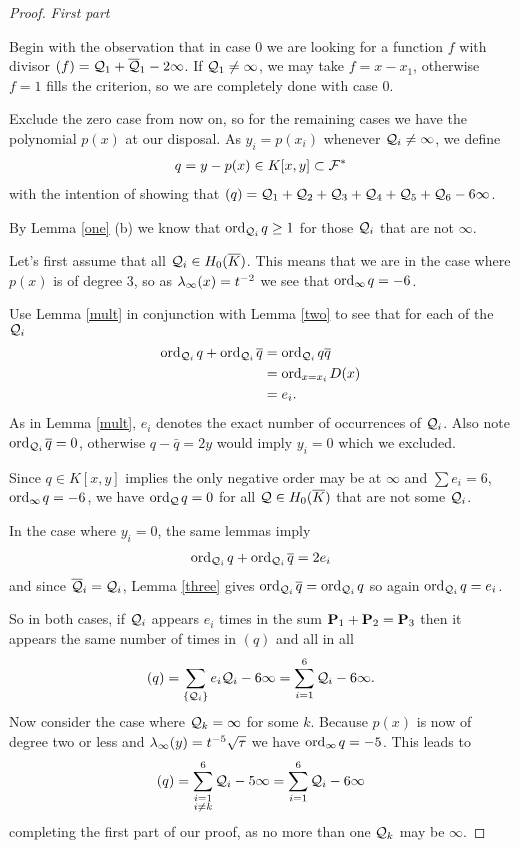 \documentclass[english,11pt,a4paper]{article}
\begin{document}
\newpage
\begin{proof}\textit{First part}

  Begin with the observation that in case 0 we are looking for a function $f$ with divisor $(f) = \q_1 + \bar \q_1 - 2 \infty$. If $\q_1 \neq \infty$, we may take $f = x-x_1$, otherwise $f = 1$ fills the criterion, so we are completely done with case 0.

  Exclude the zero case from now on, so for the remaining cases we have the polynomial $p(x)$ at our disposal. As $y_i = p(x_i)$ whenever $\q_i \neq \infty$, we define
  \begin{align*}
    q = y -p(x) \in K[x,y] \subset \F^*
  \end{align*}
  with the intention of showing that $(q) = \q_1 + \q_2 + \q_3 + \q_4 + \q_5 + \q_6 - 6 \infty$.

  By Lemma \ref{one} (b) we know that $\ordqi q \geq 1$ for those $\q_i$ that are not $\infty$.

  Let's first assume that all $\q_i \in \enkb$. This means that we are in the case where $p(x)$ is of degree 3, so as $\li (x) = t^{-2}$ we see that $\ordi q = -6$.

  Use Lemma \ref{mult} in conjunction with Lemma \ref{two} to see that for each of the $\q_i$
  \begin{align*}
    \ordqi q + \ordqi \bar q &= \ordqi q \bar q\\
                    &= \text{ord}_{x=x_i}\hspace{0.4mm} D(x)\\
                    &= e_i.
  \end{align*}
  As in Lemma \ref{mult}, $e_i$ denotes the exact number of occurrences of $\q_i$. Also note $\ordqi \bar q = 0$, otherwise $q - \bar q = 2y$ would imply $y_i = 0$ which we excluded.

  Since $q \in K[x,y]$ implies the only negative order may be at $\infty$ and $\sum e_i = 6$, $\ordi q = -6$, we have $\ordq q = 0$ for all $\q \in \enkb$ that are not some $\q_i$.

  In the case where $y_i = 0$, the same lemmas imply
  \begin{align*}
    \ordqi q + \ordqi \bar q = 2e_i
  \end{align*}
  and since $\bar \q_i = \q_i$, Lemma \ref{three} gives $\ordqi \bar q = \ordqi q$ so again $\ordqi q = e_i$.

  So in both cases, if $\q_i$ appears $e_i$ times in the sum $\P_1 + \P_2 = \P_3$ then it appears the same number of times in $(q)$ and all in all
  \begin{align*}
    (q) = \sum_{\{\q_i\}} e_i \q_i - 6 \infty = \sum_{i=1}^6 \q_i - 6 \infty.
  \end{align*}
  Now consider the case where $\q_k = \infty$ for some $k$. Because $p(x)$ is now of degree two or less and $\li(y) = t^{-5}\sqrt \tau$ we have $\ordi q = -5$. This leads to
  \begin{align*}
    (q) = \sum_{\substack{i=1 \\ i \neq k}}^6 \q_i - 5 \infty = \sum_{i=1}^6 \q_i - 6 \infty
  \end{align*}
  completing the first part of our proof, as no more than one $\q_k$ may be $\infty$.


\end{proof}
\end{document}
